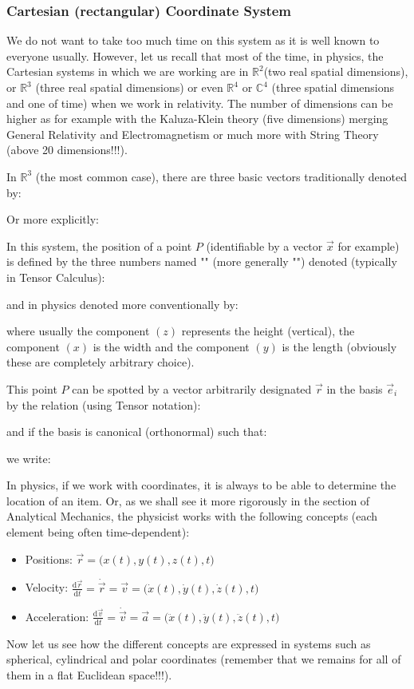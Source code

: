 	
	\subsubsection{Cartesian (rectangular) Coordinate System}
	We do not want to take too much time on this system as it is well known to everyone usually. However, let us recall that most of the time, in physics, the Cartesian systems in which we are working are in $\mathbb{R}^2 $(two real spatial dimensions), or $\mathbb{R}^3$ (three real spatial dimensions) or even $\mathbb{R}^4$ or $\mathbb{C}^4$ (three spatial dimensions and one of time) when we work in relativity. The number of dimensions can be higher as for example with the Kaluza-Klein theory (five dimensions) merging General Relativity and Electromagnetism or much more with String Theory (above 20 dimensions!!!).
	
	In $\mathbb{R}^3$ (the most common case), there are three basic vectors traditionally denoted by:
	
	Or more explicitly:
	
	
	In this system, the position of a point $P$ (identifiable by a vector $\vec{x}$ for example) is defined by the three numbers named  "" (more generally "") denoted (typically in Tensor Calculus):
	
	and in physics denoted more conventionally by:
	
	where usually the component $(z)$ represents the height (vertical), the component $(x)$ is the width and the component  $(y)$ is the length (obviously these are completely arbitrary choice).
	
	This point $P$ can be spotted by a vector arbitrarily designated $\vec{r}$ in the basis  $\vec{e}_i$ by the relation (using Tensor notation):
	
	and if the basis is canonical (orthonormal) such that:
	
	we write:
	
	In physics, if we work with coordinates, it is always to be able to determine the location of an item. Or, as we shall see it more rigorously in the section of Analytical Mechanics, the physicist works with the following concepts (each element being often time-dependent):
	\begin{itemize}
		\item Positions: $\vec{r}=\biggl(x(t),y(t),z(t),t\biggr)$
		
		\item Velocity: $\displaystyle\frac{\mathrm{d}\vec{r}}{\mathrm{d}t}=\dot{\vec{r}}=\vec{v}
	=\biggl(\dot{x}(t),\dot{y}(t),\dot{z}(t),t\biggr)$
	
		\item Acceleration: $\displaystyle\frac{\mathrm{d}\vec{v}}{\mathrm{d}t}=\dot{\vec{v}}=\vec{a}=
	\biggl(\ddot{x}(t),\ddot{y}(t),\ddot{z}(t),t\biggr)$
	\end{itemize}
	Now let us see how the different concepts are expressed in systems such as spherical, cylindrical and polar coordinates (remember that we remains for all of them in a flat Euclidean space!!!).
	
